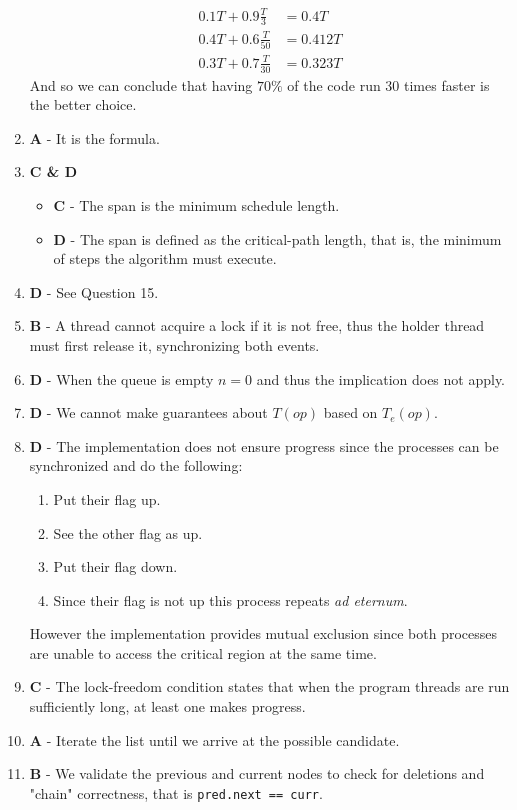 \documentclass[a4paper,twocolumn]{article}
\begin{document}
\begin{enumerate}
\begin{equation*}
\begin{split}
            0.1 T + 0.9\frac{T}{3} & = 0.4T \\
            0.4 T + 0.6\frac{T}{50} & = 0.412T \\
            0.3 T + 0.7\frac{T}{30} & = 0.323T
        \end{split}
    \end{equation*}
    And so we can conclude that having $70\%$ of the code run 30 times faster is the better choice.
    \item \textbf{A} - It is the formula.
    \item \textbf{C \& D} \begin{itemize}
        \item \textbf{C} - The span is the minimum schedule length.
        \item \textbf{D} - The span is defined as the critical-path length, that is, the minimum of steps the algorithm must execute.
    \end{itemize}
    \item \textbf{D} - See Question 15.
    \item \textbf{B} - A thread cannot acquire a lock if it is not free, thus the holder thread must first release it, synchronizing both events.
    \item \textbf{D} - When the queue is empty $n=0$ and thus the implication does not apply.
    \item \textbf{D} - We cannot make guarantees about $T(op)$ based on $T_e(op)$.
    \item \textbf{D} - The implementation does not ensure progress since the processes can be synchronized and do the following:
    \begin{enumerate}
        \item Put their flag up.
        \item See the other flag as up.
        \item Put their flag down.
        \item Since their flag is not up this process repeats \textit{ad eternum}.
    \end{enumerate}
    However the implementation provides mutual exclusion since both processes are unable to access the critical region at the same time.
    \item \textbf{C} - The lock-freedom condition states that when the program threads are run sufficiently long, at least one makes progress.
    \item \textbf{A} - Iterate the list until we arrive at the possible candidate.
    \item \textbf{B} - We validate the previous and current nodes to check for deletions and "chain" correctness, that is \texttt{pred.next == curr}.

\end{enumerate}
\end{document}
